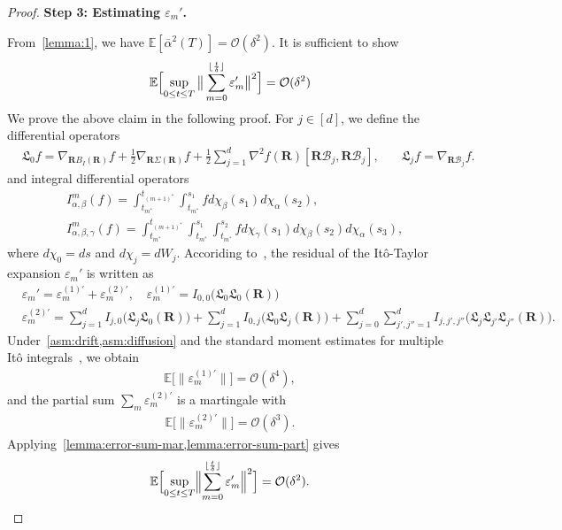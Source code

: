 \documentclass[11pt, a4paper, onecolumn]{article}
\newcommand{\E}{\mathbb{E}}
\newcommand{\bfR}{\mathbf{R}}
\newcommand{\B}{\mathcal{B}}
\newcommand{\nm}[1]{\mathsf{#1}}
\newcommand{\calO}{\mathcal{O}}
\newcommand{\ms}{{m^*}}
\newcommand{\mos}{{(m+1)^*}}
\newcommand{\sumub}{{\lfloor \frac{t}{\delta} \rfloor}}
\newcommand{\thalf}{{\tfrac{1}{2}}}
\newcommand{\eprm}{\varepsilon_m'}
\newcommand{\eprmn}[1]{\varepsilon_m^{(#1)'}}
\newcommand{\EsupN}[1]{\E\Bigl[ \sup_{0 \le t\le T} \big\| \sum_{m=0}^{\sumub} #1 \big\|^2 \Bigr]}
\begin{document}
\begin{appendices}
\begin{proof}
\noindent\textbf{Step 3:  Estimating $\eprm$.} 


From~\cref{lemma:1}, we have $\E[\bar \alpha^2(T)] = \calO(\delta^2)$. It is sufficient to show
\begin{align*}
    \EsupN{\eprm} = \calO(\delta^2)
\end{align*}
We prove the above claim in the following proof. For $j \in [d]$, we define the differential operators
\begin{align*}
   & \mathfrak L_0 f=\nabla_{\bfR B_{I}(\bfR)} f + \thalf\nabla_{\bfR \nm \Sigma(\bfR)} f+\thalf\sum_{j=1}^{d}\nabla^{2}f(\bfR)[\bfR \B_{j},\bfR \B_{j}], \quad
   & \mathfrak L_j f=\nabla_{\bfR \B_{j}} f.
\end{align*}
and integral differential operators
\begin{align*}
    & I_{\alpha,\beta}^m(f)=\int_{t_\ms}^{t_\mos}\int_{t_\ms}^{s_1} f d\chi_\beta(s_1) d\chi_\alpha(s_2), \\ & I_{\alpha,\beta,\gamma}^m(f)=\int_{t_\ms}^{t_\mos}\int_{t_\ms}^{s_1}\int_{t_\ms}^{s_2} f d\chi_\gamma(s_1) d\chi_\beta(s_2)d\chi_\alpha(s_3), 
\end{align*}
where $d\chi_0 = ds$ and $d\chi_j = dW_j$. Accoriding to~\cite{kloeden1992numerical}, the residual of the It\^o-Taylor expansion $\eprm$ is written as
\begin{align*}
    &\eprm =  \eprmn{1}+\eprmn{2}, \quad \eprmn{1} = I_{0,0}\big(\mathfrak L_0\mathfrak L_0(\bfR)\big)\\
    &\eprmn{2}=  \sum_{j=1}^d I_{j,0} \big(\mathfrak L_j\mathfrak L_0(\bfR)\big) +   \sum_{j=1}^d I_{0,j} \big(\mathfrak L_0\mathfrak L_j(\bfR)\big) + \sum_{j=0}^d\sum_{j',j''=1}^d I_{j,j',j''}\big(\mathfrak L_j\mathfrak L_{j'}\mathfrak L_{j''}(\bfR)\big).
\end{align*}
Under~\cref{asm:drift,asm:diffusion} and the standard moment estimates for multiple It\^o integrals~\cite{kloeden1992numerical}, we obtain
\begin{align*}
    \mathbb E\bigl[\|\eprmn{1}\|\bigr]=\mathcal O(\delta^{4}),
\end{align*}
and the partial sum $\sum_{m}\eprmn{2}$ is a martingale with
\begin{align*}
    \mathbb E\bigl[\|\eprmn{2}\|\bigr]=\mathcal O(\delta^{3}).
\end{align*}
Applying~\cref{lemma:error-sum-mar,lemma:error-sum-part} gives
\begin{align}\label{eq:app-C-combine-2}
      \mathbb E\Bigl[
     \sup_{0\le t\le T}
     \Bigl\|\sum_{m=0}^{\sumub}\varepsilon_m'\Bigr\|^{2}
  \Bigr]
  =\mathcal O(\delta^{2}).
\end{align}


\end{proof}
\end{appendices}
\end{document}
